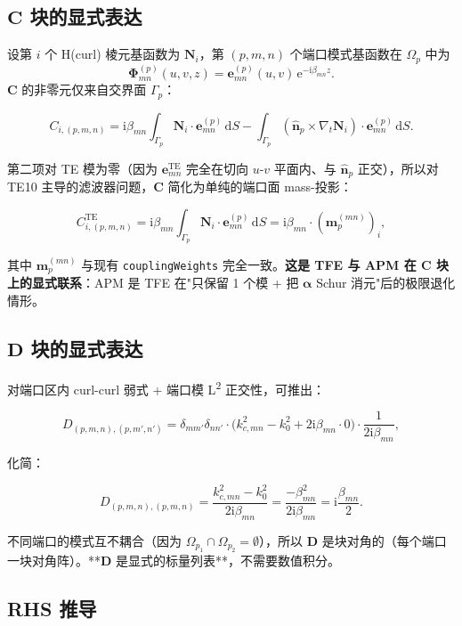 \documentclass[11pt,a4paper]{ctexart}
\newcommand{\im}{\mathrm{i}}
\begin{document}
\subsection{\texorpdfstring{$\bm C$ 块的显式表达}{C 块的显式表达}}

设第 $i$ 个 H(curl) 棱元基函数为 $\bm N_i$，第 $(p, m, n)$ 个端口模式基函数在 $\Omega_p$ 中为
\[
  \bm \Phi_{mn}^{(p)}(u, v, z) = \bm e_{mn}^{(p)}(u, v)\,\mathrm{e}^{-\im\beta_{mn} z}.
\]
$\bm C$ 的非零元仅来自交界面 $\Gamma_p$：

\[
  C_{i, (p, m, n)} = \im\beta_{mn} \int_{\Gamma_p} \bm N_i \cdot \bm e_{mn}^{(p)}\,\mathrm{d}S
                   - \int_{\Gamma_p} (\hat{\bm n}_p \times \nabla_t \bm N_i) \cdot \bm e_{mn}^{(p)}\,\mathrm{d}S.
\]

第二项对 TE 模为零（因为 $\bm e_{mn}^{\text{TE}}$ 完全在切向 $u$-$v$ 平面内、与 $\hat{\bm n}_p$ 正交），所以对 TE10 主导的滤波器问题，$\bm C$ 简化为单纯的端口面 mass-投影：

\[
  C_{i, (p, m, n)}^{\text{TE}} = \im\beta_{mn} \int_{\Gamma_p} \bm N_i \cdot \bm e_{mn}^{(p)}\,\mathrm{d}S
  = \im\beta_{mn} \cdot (\bm m_p^{(mn)})_i,
\]

其中 $\bm m_p^{(mn)}$ 与现有 \texttt{couplingWeights} 完全一致。\textbf{这是 TFE 与 APM 在 $\bm C$ 块上的显式联系}：APM 是 TFE 在"只保留 1 个模 + 把 $\bm \alpha$ Schur 消元"后的极限退化情形。

\subsection{\texorpdfstring{$\bm D$ 块的显式表达}{D 块的显式表达}}

对端口区内 curl-curl 弱式 + 端口模 L\textsuperscript{2} 正交性，可推出：

\[
  D_{(p, m, n), (p, m', n')} = \delta_{mm'}\delta_{nn'} \cdot \big(k_{c, mn}^2 - k_0^2 + 2\im\beta_{mn} \cdot 0\big) \cdot \frac{1}{2\im\beta_{mn}},
\]

化简：

\[
  D_{(p, m, n), (p, m, n)} = \frac{k_{c, mn}^2 - k_0^2}{2\im\beta_{mn}}
  = \frac{-\beta_{mn}^2}{2\im\beta_{mn}}
  = \im \frac{\beta_{mn}}{2}.
\]

不同端口的模式互不耦合（因为 $\Omega_{p_1} \cap \Omega_{p_2} = \emptyset$），所以 $\bm D$ 是块对角的（每个端口一块对角阵）。**$\bm D$ 是显式的标量列表**，不需要数值积分。

\subsection{RHS 推导}
\end{document}
